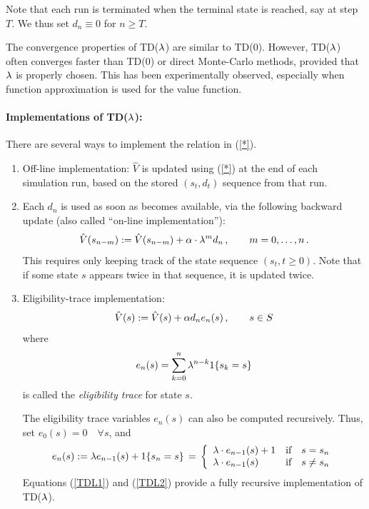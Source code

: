 Note that each run is terminated when the terminal state is reached,
say at step $T$. We thus set $d_n\equiv 0$ for $n\ge T$.

The convergence properties of TD($\lambda$) are similar to TD(0).
However, TD($\lambda$) often converges faster than TD(0) or
direct Monte-Carlo methods, provided that $\lambda$ is properly chosen.
This has been experimentally observed, especially when function
approximation is used for the value function.

\paragraph{Implementations of TD($\lambda$):}

There are several ways to implement the relation in (\ref{*}).
\begin{enumerate}
  \item Off-line implementation: $\hat V$ is updated using (\ref{*})
at the end of each simulation run, based on the
stored $(s_t, d_t)$ sequence from that run.

  \item Each $d_n$ is used as soon as becomes available, via the following
backward update (also called ``on-line implementation''):
\begin{equation}
\label{**}
\hat V(s_{n-m}) := \hat V(s_{n-m}) + \alpha \cdot \lambda^m d_n\,, \qquad m=0,\dots,n\,.
\end{equation}
This requires only keeping track of the state sequence $(s_t, t \ge 0)$.
Note that if some state $s$ appears twice in that sequence, it is updated
twice.
  \item Eligibility-trace implementation:
\begin{equation} \label{TDL1}
\hat V(s) := \hat V(s) + \alpha d_n e_n (s)\,, \qquad s\in S
\end{equation}
where
$$
e_n (s) = \sum_{k=0}^n \lambda^{n-k} 1\{s_k = s\}
$$
is called the {\em eligibility trace} for state $s$.

The eligibility trace variables $e_n (s)$ can also be computed recursively.
Thus, set $e_0(s)=0 \quad \forall s$, and
\begin{equation} \label{TDL2}
e_n(s) := \lambda e_{n-1}(s) +1\{s_n=s\} \,=\, \left\{
\begin{array}{lll}
\lambda\cdot e_{n-1}(s) + 1 & \text{if} & s=s_n \\
\lambda\cdot e_{n-1}(s)  & \text{if} & s\not=s_n
\end{array}
\right.
\end{equation}
Equations (\ref{TDL1}) and (\ref{TDL2}) provide a fully recursive implementation
of TD($\lambda$).
\end{enumerate}

